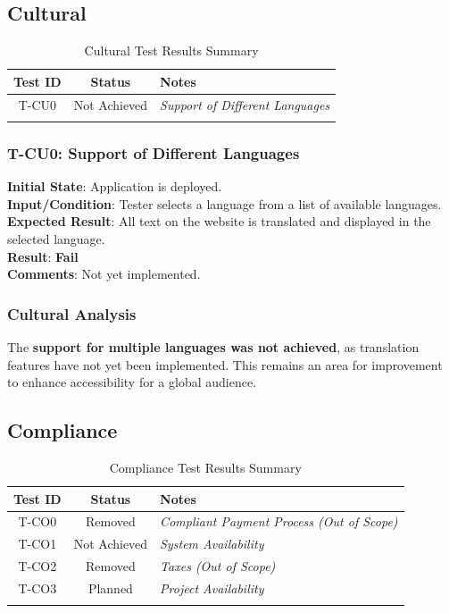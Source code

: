 \documentclass[12pt, titlepage]{article}
\begin{document}
\subsection{Cultural}
\begin{longtable}{|c|c|l|}
    \hline
    \textbf{Test ID} & \textbf{Status} & \textbf{Notes} \\
    \hline
    T-CU0 & Not Achieved & \textit{Support of Different Languages} \\
    \hline
    \caption{Cultural Test Results Summary}
\end{longtable}

\subsubsection{T-CU0: Support of Different Languages}
\textbf{Initial State}: Application is deployed.\\
\textbf{Input/Condition}: Tester selects a language from a list of available languages.\\
\textbf{Expected Result}: All text on the website is translated and displayed in the selected language.\\
\textbf{Result}: \textbf{Fail}\\
\textbf{Comments}: Not yet implemented.

\subsubsection{Cultural Analysis}
The \textbf{support for multiple languages was not achieved}, as translation features have not yet been implemented. This remains an area for improvement to enhance accessibility for a global audience.
\subsection{Compliance}
\begin{longtable}{|c|c|l|}
    \hline
    \textbf{Test ID} & \textbf{Status} & \textbf{Notes} \\
    \hline
    T-CO0 & Removed & \textit{Compliant Payment Process (Out of Scope)} \\
    T-CO1 & Not Achieved & \textit{System Availability} \\
    T-CO2 & Removed & \textit{Taxes (Out of Scope)} \\
    T-CO3 & Planned & \textit{Project Availability} \\
    \hline
    \caption{Compliance Test Results Summary}
\end{longtable}
\end{document}
